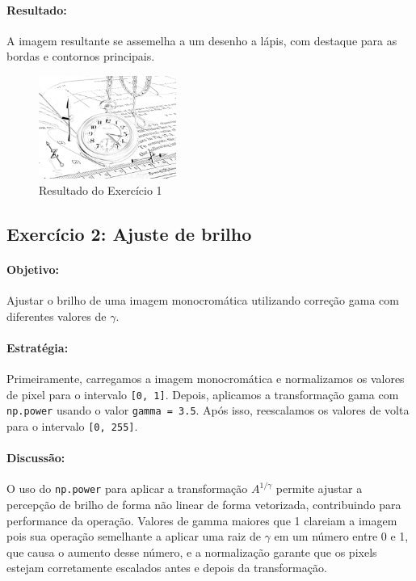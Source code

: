 \documentclass[12pt,a4paper]{report}
\begin{document}
\paragraph{Resultado:} 
A imagem resultante se assemelha a um desenho a lápis, com destaque para as bordas e contornos principais.
\begin{figure}[H]
  \centering
  \includegraphics[width=0.4\textwidth]{imagens/ex1.png}
  \caption{Resultado do Exercício 1}
\end{figure}

\subsection{Exercício 2: Ajuste de brilho}
\paragraph{Objetivo:} 
Ajustar o brilho de uma imagem monocromática utilizando correção gama com diferentes valores de \( \gamma \).

\paragraph{Estratégia:} 
Primeiramente, carregamos a imagem monocromática e normalizamos os valores de pixel para o intervalo \texttt{[0, 1]}. Depois, aplicamos a transformação gama com \texttt{np.power} usando o valor \texttt{gamma = 3.5}. Após isso, reescalamos os valores de volta para o intervalo \texttt{[0, 255]}.

\paragraph{Discussão:} 
O uso do \texttt{np.power} para aplicar a transformação \( A^{1/\gamma} \) permite ajustar a percepção de brilho de forma não linear de forma vetorizada, contribuindo para performance da operação. Valores de gamma maiores que 1 clareiam a imagem pois sua operação semelhante a aplicar uma raiz de \(\gamma \) em um número entre 0 e 1, que causa o aumento desse número, e a normalização garante que os pixels estejam corretamente escalados antes e depois da transformação.
\end{document}

